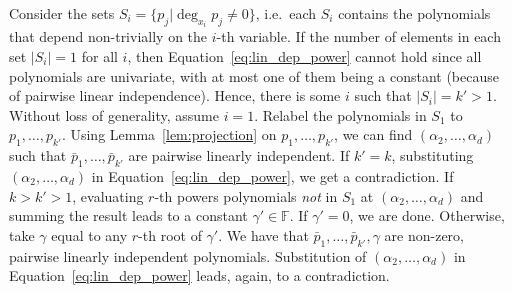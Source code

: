 \documentclass{amsart}
\theoremstyle{definition}
\theoremstyle{remark}
\numberwithin{equation}{section}
\newcommand{\F}{\mathbb{F}}
\begin{document}
Consider the sets $ S_i = \{p_j | \deg_{x_i}p_j \neq 0\} $, i.e.\ each $ S_i $
contains the polynomials that depend non-trivially on the $ i $-th variable. If
the number of elements in each set $ |S_i| = 1 $ for all $ i $, then
Equation~\eqref{eq:lin_dep_power} cannot hold since all polynomials are
univariate, with at most one of them being a constant (because of pairwise
linear independence). Hence, there is some $ i $ such that $ |S_i| = k'> 1 $.
Without loss of generality, assume $ i=1 $. Relabel the polynomials in $ S_1 $
to $ p_1, \ldots, p_{k'} $.  Using Lemma~\ref{lem:projection} on $ p_1, \ldots,
p_{k'} $, we can find $ (\alpha_2, \ldots, \alpha_d) $ such that $ \bar{p}_1,
\ldots, \bar{p}_{k'} $ are pairwise linearly independent. If $ k' = k $,
substituting $ (\alpha_2, \ldots, \alpha_d) $ in
Equation~\ref{eq:lin_dep_power}, we get a contradiction. If $ k > k' > 1$,
evaluating $ r $-th powers polynomials \emph{not} in $ S_1 $ at  $ (\alpha_2,
\ldots, \alpha_d) $ and summing the result leads to a constant $ \gamma'\in \F
$. If $ \gamma' = 0 $, we are done. Otherwise, take $ \gamma $ equal to any $ r $-th root
of $ \gamma' $. We have that $ \bar{p}_1, \ldots, \bar{p}_{k'}, \gamma $ are
non-zero, pairwise linearly independent polynomials.  Substitution of $
(\alpha_2, \ldots, \alpha_d) $ in Equation~\ref{eq:lin_dep_power} leads, again,
to a contradiction.
\end{document}
